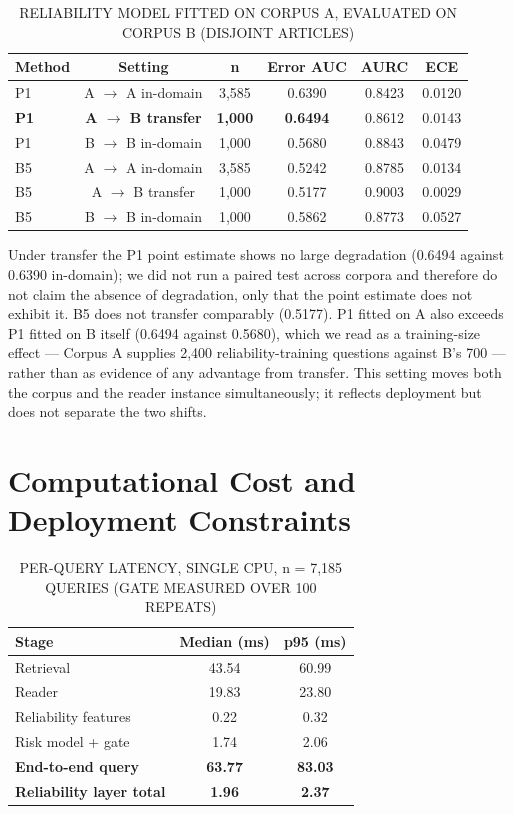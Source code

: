 \documentclass[conference]{IEEEtran}
\begin{document}
\begin{table}[t]\centering\caption{RELIABILITY MODEL FITTED ON CORPUS A, EVALUATED ON CORPUS B (DISJOINT ARTICLES)}\label{tab:8}\footnotesize
\begin{tabular}{lccccc}\hline
\textbf{Method} & \textbf{Setting} & \textbf{n} & \textbf{Error AUC} & \textbf{AURC} & \textbf{ECE} \\ \hline
P1 & A $\rightarrow$ A in-domain & 3,585 & 0.6390 & 0.8423 & 0.0120 \\
\textbf{P1} & \textbf{A $\rightarrow$ B transfer} & \textbf{1,000} & \textbf{0.6494} & 0.8612 & 0.0143 \\
P1 & B $\rightarrow$ B in-domain & 1,000 & 0.5680 & 0.8843 & 0.0479 \\
B5 & A $\rightarrow$ A in-domain & 3,585 & 0.5242 & 0.8785 & 0.0134 \\
B5 & A $\rightarrow$ B transfer & 1,000 & 0.5177 & 0.9003 & 0.0029 \\
B5 & B $\rightarrow$ B in-domain & 1,000 & 0.5862 & 0.8773 & 0.0527 \\
\hline\end{tabular}\end{table}

Under transfer the P1 point estimate shows no large degradation (0.6494 against 0.6390 in-domain); we did not run a paired test across corpora and therefore do not claim the absence of degradation, only that the point estimate does not exhibit it. B5 does not transfer comparably (0.5177). P1 fitted on A also exceeds P1 fitted on B itself (0.6494 against 0.5680), which we read as a training-size effect --- Corpus A supplies 2,400 reliability-training questions against B's 700 --- rather than as evidence of any advantage from transfer. This setting moves both the corpus and the reader instance simultaneously; it reflects deployment but does not separate the two shifts.

\section{Computational Cost and Deployment Constraints}

\begin{table}[t]\centering\caption{PER-QUERY LATENCY, SINGLE CPU, n = 7,185 QUERIES (GATE MEASURED OVER 100 REPEATS)}\label{tab:9}\footnotesize
\begin{tabular}{lcc}\hline
\textbf{Stage} & \textbf{Median (ms)} & \textbf{p95 (ms)} \\ \hline
Retrieval & 43.54 & 60.99 \\
Reader & 19.83 & 23.80 \\
Reliability features & 0.22 & 0.32 \\
Risk model + gate & 1.74 & 2.06 \\
\textbf{End-to-end query} & \textbf{63.77} & \textbf{83.03} \\
\textbf{Reliability layer total} & \textbf{1.96} & \textbf{2.37} \\
\hline\end{tabular}\end{table}
\end{document}

